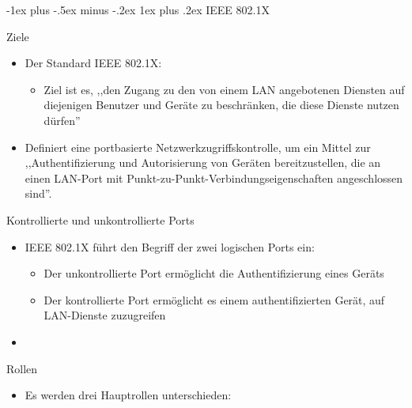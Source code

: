\documentclass[a4paper]{article}
\makeatletter
\renewcommand{\subsubsection}{\@startsection{subsubsection}{3}{0mm}%
 {-1ex plus -.5ex minus -.2ex}%
 {1ex plus .2ex}%
 {\normalfont\small\bfseries}}
\makeatother
\begin{document}
\begin{multicols}{3}
    \subsubsection{IEEE 802.1X}

    Ziele

    \begin{itemize}
        \item
              Der Standard IEEE 802.1X:

              \begin{itemize}
                  \item
                        Ziel ist es, ,,den Zugang zu den von einem LAN angebotenen Diensten
                        auf diejenigen Benutzer und Geräte zu beschränken, die diese Dienste
                        nutzen dürfen''
              \end{itemize}
        \item
              Definiert eine portbasierte Netzwerkzugriffskontrolle, um ein Mittel
              zur ,,Authentifizierung und Autorisierung von Geräten bereitzustellen,
              die an einen LAN-Port mit Punkt-zu-Punkt-Verbindungseigenschaften
              angeschlossen sind''.
    \end{itemize}

    Kontrollierte und unkontrollierte Ports

    \begin{itemize}
        \item
              IEEE 802.1X führt den Begriff der zwei logischen Ports ein:

              \begin{itemize}
                  \item
                        Der unkontrollierte Port ermöglicht die Authentifizierung eines
                        Geräts
                  \item
                        Der kontrollierte Port ermöglicht es einem authentifizierten Gerät,
                        auf LAN-Dienste zuzugreifen
              \end{itemize}
        \item
    \end{itemize}

    Rollen

    \begin{itemize}
        \item
              Es werden drei Hauptrollen unterschieden:


\end{itemize}
\end{multicols}
\end{document}
